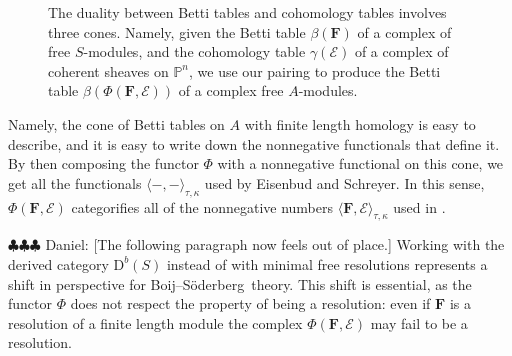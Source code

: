 \documentclass[12pt]{amsart}
\theoremstyle{definition}
\theoremstyle{remark}
\newcommand{\PP}{\mathbb{P}}
\newcommand{\cE}{\mathcal{E}}
\newcommand{\FF}{\mathbf{F}}
\newcommand{\DD}{\mathrm{D}}
\newcommand{\CQ}{\mathrm{C}}
\newcommand{\BBQ}{\mathrm{B}}
\newcommand{\daniel}[1]{{\color{green} \sf $\clubsuit\clubsuit\clubsuit$ Daniel: [#1]}}
\def\BS{Boij--S\"oderberg~}
\begin{document}
\begin{figure}
\caption{The duality between Betti tables and cohomology tables involves three cones.  Namely, given the Betti table $\beta(\FF)$ of a complex of free $S$-modules, and the cohomology table $\gamma(\cE)$ of a complex of coherent sheaves on $\PP^n$, we use our pairing to produce the Betti table $\beta(\Phi(\FF,\cE))$ of a complex free $A$-modules. 
}
\label{fig:bracket}
\end{figure}


Namely, the cone of Betti tables on $A$ with finite length homology is easy to describe, and it is easy to write down the nonnegative functionals that define it.
By then composing the functor $\Phi$ with a nonnegative functional on this cone, we get all the functionals $\langle -,-\rangle_{\tau,\kappa}$ used by Eisenbud and Schreyer.  In this sense, $\Phi(\FF,\cE)$ categorifies all of the nonnegative numbers $\langle \FF, \cE\rangle_{\tau,\kappa}$ used in \cite{eis-schrey1}.

\daniel{The following paragraph now feels out of place.}
Working with the derived category $\DD^b(S)$ instead of with minimal free resolutions represents a shift in perspective for \BS theory.  This shift is essential, as the functor $\Phi$ does not respect the property of being a resolution: even if $\FF$ is a resolution of a finite length module the complex $\Phi(\FF,\cE)$ may fail to be a resolution.  
\end{document}
